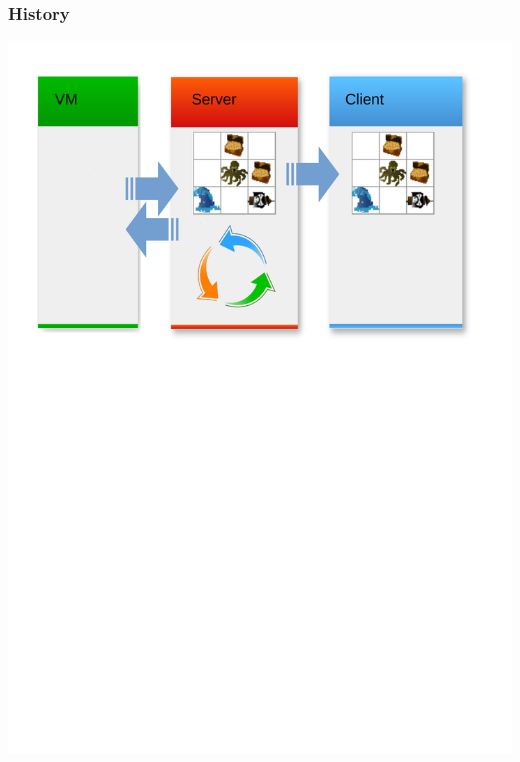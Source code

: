 \begin{frame}
	\frametitle{History}
	\begin{center}
		\includegraphics[scale=0.5]{simulation/history2.pdf}
	\end{center}
\end{frame}
